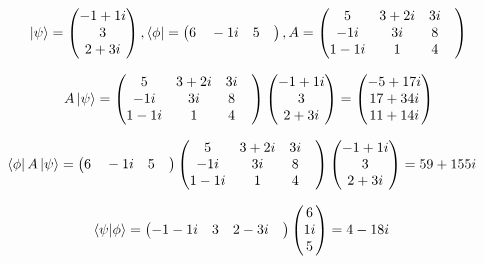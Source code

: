 \documentclass[10pt,a4paper]{article}
\begin{document}
\begin{align}
\ket{\psi} = \begin{pmatrix}
-1+1i\\
3\\
2+3i\\
\end{pmatrix}, \bra{\phi} = \begin{pmatrix}
6\quad-1i\quad5\quad\end{pmatrix}, A = \begin{pmatrix}
5 &3+2i &3i &\\-1i &3i &8 &\\1-1i &1 &4 &\\\end{pmatrix}\end{align}

\begin{align}
A\ket{\psi} = \begin{pmatrix}
5 &3+2i &3i &\\-1i &3i &8 &\\1-1i &1 &4 &\\\end{pmatrix}\begin{pmatrix}
-1+1i\\
3\\
2+3i\\
\end{pmatrix}=\begin{pmatrix}
-5+17i\\
17+34i\\
11+14i\\
\end{pmatrix}\end{align}

\begin{align}
\bra{\phi}A\ket{\psi}= \begin{pmatrix}
6\quad-1i\quad5\quad\end{pmatrix}\begin{pmatrix}
5 &3+2i &3i &\\-1i &3i &8 &\\1-1i &1 &4 &\\\end{pmatrix}\begin{pmatrix}
-1+1i\\
3\\
2+3i\\
\end{pmatrix}=59+155i &\end{align}

\begin{align}
\braket{\psi|\phi}= \begin{pmatrix}
-1-1i\quad3\quad2-3i\quad\end{pmatrix}\begin{pmatrix}
6\\
1i\\
5\\
\end{pmatrix}=4-18i &\end{align}
\end{document}
